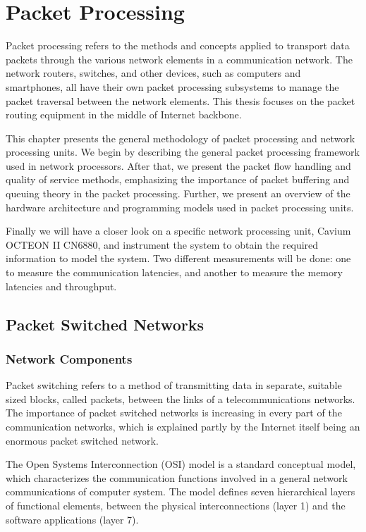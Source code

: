 \chapter{Packet Processing}
\label{chapter:packet-processing-systems}

Packet processing refers to the methods and concepts applied to transport data packets through the various network elements in a communication network. The network routers, switches, and other devices, such as computers and smartphones, all have their own packet processing subsystems to manage the packet traversal between the network elements. This thesis focuses on the packet routing equipment in the middle of Internet backbone.

This chapter presents the general methodology of packet processing and network processing units. We begin by describing the general packet processing framework used in network processors. After that, we present the packet flow handling and quality of service methods, emphasizing the importance of packet buffering and queuing theory in the packet processing. Further, we present an overview of the hardware architecture and programming models used in packet processing units.

Finally we will have a closer look on a specific network processing unit, Cavium OCTEON II CN6880, and instrument the system to obtain the required information to model the system. Two different measurements will be done: one to measure the communication latencies, and another to measure the memory latencies and throughput.

\section{Packet Switched Networks}
\subsection{Network Components}
Packet switching refers to a method of transmitting data in separate, suitable sized blocks, called packets, between the links of a telecommunications networks. The importance of packet switched networks is increasing in every part of the communication networks, which is explained partly by the Internet itself being an enormous packet switched network.

The Open Systems Interconnection (OSI) model is a standard conceptual model, which characterizes the communication functions involved in a general network communications of computer system. The model defines seven hierarchical layers of functional elements, between the physical interconnections (layer 1) and the software applications (layer 7).~\cite{ISO:1994:OSI}

